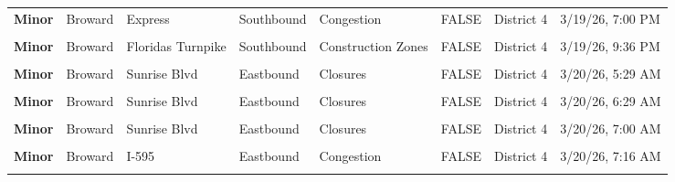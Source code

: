 \documentclass[
]{article}
\begin{document}
\begin{longtable}[t]{>{\raggedright\arraybackslash}p{1.5cm}>{\raggedright\arraybackslash}p{2.5cm}>{\raggedright\arraybackslash}p{3cm}>{\raggedright\arraybackslash}p{1.8cm}>{\raggedright\arraybackslash}p{2.5cm}lll}
\textbf{Minor} & Broward & 95 Express & Southbound & Congestion & FALSE & District 4 & 3/19/26, 7:00 PM\\
\textbf{\cellcolor{gray!10}{Minor}} & \cellcolor{gray!10}{Broward} & \cellcolor{gray!10}{Floridas Turnpike} & \cellcolor{gray!10}{Northbound} & \cellcolor{gray!10}{Incidents} & \cellcolor{gray!10}{FALSE} & \cellcolor{gray!10}{District 4} & \cellcolor{gray!10}{3/19/26, 7:29 PM}\\
\textbf{Minor} & Broward & Floridas Turnpike & Southbound & Construction Zones & FALSE & District 4 & 3/19/26, 9:36 PM\\
\textbf{\cellcolor{gray!10}{Minor}} & \cellcolor{gray!10}{Broward} & \cellcolor{gray!10}{Floridas Turnpike} & \cellcolor{gray!10}{Northbound} & \cellcolor{gray!10}{Construction Zones} & \cellcolor{gray!10}{FALSE} & \cellcolor{gray!10}{District 4} & \cellcolor{gray!10}{3/19/26, 9:37 PM}\\
\addlinespace
\textbf{Minor} & Broward & Sunrise Blvd & Eastbound & Closures & FALSE & District 4 & 3/20/26, 5:29 AM\\
\textbf{\cellcolor{gray!10}{Minor}} & \cellcolor{gray!10}{Broward} & \cellcolor{gray!10}{Sunrise Blvd} & \cellcolor{gray!10}{Westbound} & \cellcolor{gray!10}{Closures} & \cellcolor{gray!10}{FALSE} & \cellcolor{gray!10}{District 4} & \cellcolor{gray!10}{3/20/26, 5:29 AM}\\
\textbf{Minor} & Broward & Sunrise Blvd & Eastbound & Closures & FALSE & District 4 & 3/20/26, 6:29 AM\\
\textbf{\cellcolor{gray!10}{Minor}} & \cellcolor{gray!10}{Broward} & \cellcolor{gray!10}{Sunrise Blvd} & \cellcolor{gray!10}{Westbound} & \cellcolor{gray!10}{Closures} & \cellcolor{gray!10}{FALSE} & \cellcolor{gray!10}{District 4} & \cellcolor{gray!10}{3/20/26, 6:29 AM}\\
\textbf{Minor} & Broward & Sunrise Blvd & Eastbound & Closures & FALSE & District 4 & 3/20/26, 7:00 AM\\
\addlinespace
\textbf{\cellcolor{gray!10}{Minor}} & \cellcolor{gray!10}{Broward} & \cellcolor{gray!10}{Sunrise Blvd} & \cellcolor{gray!10}{Westbound} & \cellcolor{gray!10}{Closures} & \cellcolor{gray!10}{FALSE} & \cellcolor{gray!10}{District 4} & \cellcolor{gray!10}{3/20/26, 7:00 AM}\\
\textbf{Minor} & Broward & I-595 & Eastbound & Congestion & FALSE & District 4 & 3/20/26, 7:16 AM\\
\textbf{\cellcolor{gray!10}{Minor}} & \cellcolor{gray!10}{Broward} & \cellcolor{gray!10}{Sunrise Blvd} & \cellcolor{gray!10}{Eastbound} & \cellcolor{gray!10}{Closures} & \cellcolor{gray!10}{FALSE} & \cellcolor{gray!10}{District 4} & \cellcolor{gray!10}{3/20/26, 8:00 AM}\\

\end{longtable}
\end{document}
